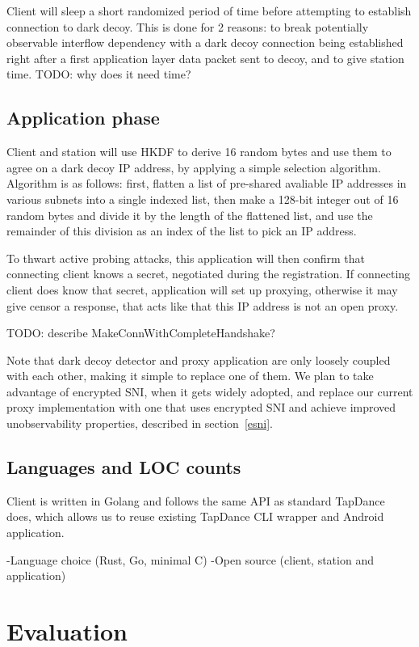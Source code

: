 \documentclass[letterpaper,twocolumn,10pt]{article}
\begin{document}
Client will sleep a short randomized period of time before attempting to establish connection to dark decoy.
This is done for 2 reasons: to break potentially observable interflow dependency with a dark decoy connection being established right after a first application layer data packet sent to decoy,
and to give station time.
TODO: why does it need time?

\subsection{Application phase}
Client and station will use HKDF to derive 16 random bytes and use them to
agree on a dark decoy IP address, by applying a simple selection algorithm.
Algorithm is as follows: first, flatten a list of pre-shared avaliable IP
addresses in various subnets into a single indexed list, then make a 128-bit
integer out of 16 random bytes and divide it by the length
of the flattened list, and use the remainder of this division as an index
of the list to pick an IP address.

To thwart active probing attacks, this application will then confirm
that connecting client knows a secret, negotiated during the registration.
If connecting client does know that secret, application will set up proxying,
otherwise it may give censor a response, that acts like that this IP address
is not an open proxy.

TODO: describe MakeConnWithCompleteHandshake?

Note that dark decoy detector and proxy application are only loosely coupled with each other,
making it simple to replace one of them.
We plan to take advantage of encrypted SNI, when it gets widely adopted,
and replace our current proxy implementation with one that uses encrypted SNI
and achieve improved unobservability properties, described in section~\ref{esni}.

\subsection{Languages and LOC counts} %
Client is written in Golang and follows the same API as standard TapDance does,
which allows us to reuse existing TapDance CLI wrapper and Android application.

-Language choice (Rust, Go, minimal C)
-Open source (client, station and application)
\fi


\section{Evaluation}
\label{sec:evaluation}
\end{document}
